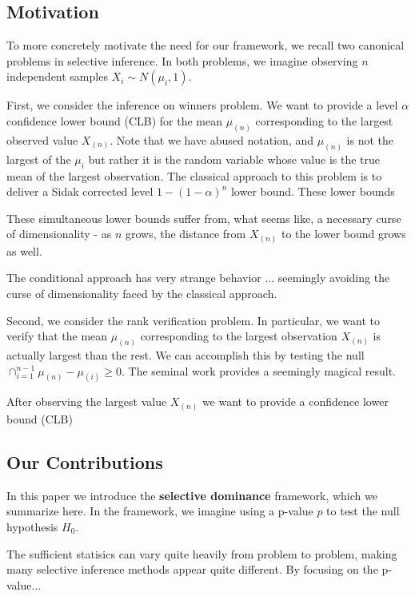 \documentclass{article}
\begin{document}
\subsection{Motivation}

To more concretely motivate the need for our framework, we recall two canonical problems in selective inference. In both problems, we imagine observing $n$ independent samples $X_i \sim N(\mu_i, 1)$.

First, we consider the inference on winners problem. We want to provide a level $\alpha$ confidence lower bound (CLB) for the mean $\mu_{(n)}$ corresponding to the largest observed value $X_{(n)}$. Note that we have abused notation, and $\mu_{(n)}$ is not the largest of the $\mu_i$ but rather it is the random variable whose value is the true mean of the largest observation. The classical approach to this problem is to deliver a Sidak corrected level $1-(1-\alpha)^n$ lower bound. These lower bounds 

These simultaneous lower bounds suffer from, what seems like, a necessary curse of dimensionality - as $n$ grows, the distance from $X_{(n)}$ to the lower bound grows as well. 

The conditional approach has very strange behavior ... seemingly avoiding the curse of dimensionality faced by the classical approach. 


Second, we consider the rank verification problem. In particular, we want to verify that the mean $\mu_{(n)}$ corresponding to the largest observation $X_{(n)}$ is actually largest than the rest. We can accomplish this by testing the null $\cap_{i=1}^{n-1} \mu_{(n)} - \mu_{(i)} \geq 0$. The seminal work \cite{Hung2019} provides a seemingly magical result.  

After observing the largest value $X_{(n)}$ we want to provide a confidence lower bound (CLB) 



\subsection{Our Contributions}

In this paper we introduce the \textbf{selective dominance} framework, which we summarize here. In the framework, we imagine using a p-value $p$ to test the null hypothesis $H_0$. 


The sufficient statisics can vary quite heavily from problem to problem, making many selective inference methods appear quite different. By focusing on the p-value... 
\end{document}
